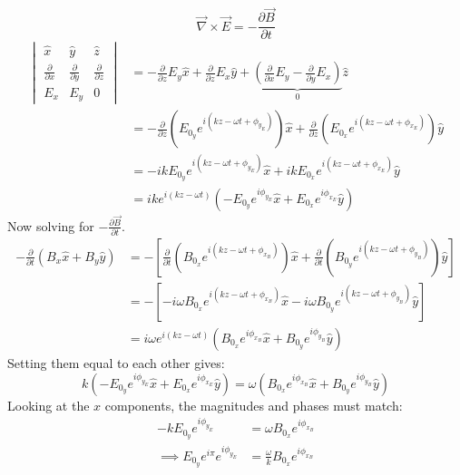 \documentclass[12pt]{article}
\begin{document}
\[\vec{\nabla}\times\vec{E} = -\frac{\partial \vec{B}}{\partial t}\]
\[\begin{aligned}
\begin{vmatrix} 
\hat{x} & \hat{y} & \hat{z} \\ 
\frac{\partial}{\partial x} & \frac{\partial}{\partial y} & \frac{\partial}{\partial z} \\ 
E_x & E_y & 0 
\end{vmatrix} &= -\frac{\partial}{\partial z} E_y \hat{x} + \frac{\partial}{\partial z} E_x \hat{y} + \underbrace{\left( \frac{\partial}{\partial x} E_y - \frac{\partial}{\partial y} E_x \right)}_{0} \hat{z}\\
&= -\frac{\partial}{\partial z} \left( E_{0_y} e^{i (kz - \omega t + \phi_{y_E})} \right) \hat{x} + \frac{\partial}{\partial z} \left( E_{0_x} e^{i (kz - \omega t + \phi_{x_E})} \right) \hat{y}\\
&= -ik E_{0_y} e^{i (kz - \omega t + \phi_{y_E})} \hat{x} + ik E_{0_x} e^{i (kz - \omega t + \phi_{x_E})} \hat{y}\\
&= ik e^{i (kz - \omega t)} \left( -E_{0_y} e^{i \phi_{y_E}} \hat{x} + E_{0_x} e^{i \phi_{x_E}} \hat{y} \right)
\end{aligned}\]
Now solving for $-\frac{\partial \vec{B}}{\partial t}$.
\[\begin{aligned}
    -\frac{\partial}{\partial t}\left(B_x \hat{x} + B_y \hat{y}\right) &= -\left[\frac{\partial}{\partial t}\left(B_{0_x} e^{i (kz - \omega t + \phi_{x_B})}\right)\hat{x} + \frac{\partial}{\partial t}\left(B_{0_y} e^{i (kz - \omega t + \phi_{y_B})}\right) \hat{y}\right]\\
    &= -\left[-i\omega B_{0_x} e^{i (kz - \omega t + \phi_{x_B})}\hat{x} - i\omega B_{0_y} e^{i (kz - \omega t + \phi_{y_B})} \hat{y}\right]\\
    &= i\omega e^{i (kz - \omega t)} \left(B_{0_x} e^{i \phi_{x_B}} \hat{x} + B_{0_y} e^{i \phi_{y_B}} \hat{y}\right)
\end{aligned}\]
Setting them equal to each other gives:
\[k \left( -E_{0_y} e^{i \phi_{y_E}} \hat{x} + E_{0_x} e^{i \phi_{x_E}} \hat{y} \right) = \omega \left(B_{0_x} e^{i \phi_{x_B}} \hat{x} + B_{0_y} e^{i \phi_{y_B}} \hat{y}\right)\]
Looking at the $x$ components, the magnitudes and phases must match:
\[\begin{aligned}
    -kE_{0_y}e^{i\phi_{y_E}} &= \omega B_{0_x} e^{i\phi_{x_B}} \\
    \implies E_{0_y}e^{i\pi}e^{i\phi_{y_E}} &= \frac{\omega}{k} B_{0_x}e^{i\phi_{x_B}} \\
\end{aligned}\]
\end{document}

